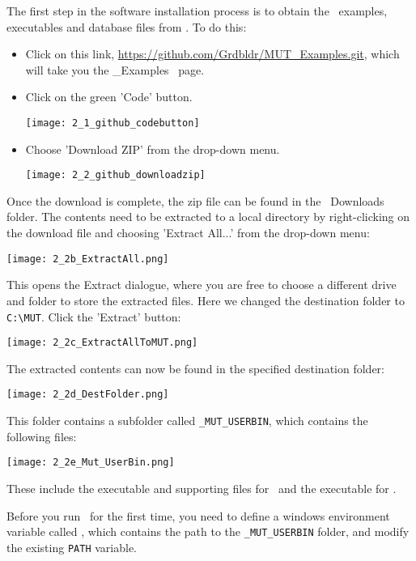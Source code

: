 \label{texfile:Installation}
The first step in the software installation process is to obtain the \mut\ examples, executables and database files from
\github.  To do this:
\begin{itemize}
     \item Click on this link, \url{https://github.com/Grdbldr/MUT_Examples.git}, which will take you the \mut\_Examples \github\ page.
     \item Click on the green 'Code' button.

        \texttt{[image: 2\_1\_github\_codebutton]}

     \item Choose 'Download ZIP' from the drop-down menu.

        \texttt{[image: 2\_2\_github\_downloadzip]}

\end{itemize}

Once the download is complete, the zip file can be found in the \windows\ Downloads folder.  The contents need to be extracted to a local directory by right-clicking on the download file and choosing 'Extract All...' from the drop-down menu:

        \texttt{[image: 2\_2b\_ExtractAll.png]}

This opens the Extract dialogue, where you are free to choose a different drive and folder to store the extracted files.  Here we changed the destination folder to \verb+C:\MUT+.  Click the 'Extract' button:

        \texttt{[image: 2\_2c\_ExtractAllToMUT.png]}

The extracted contents can now be found in the specified destination folder:

        \texttt{[image: 2\_2d\_DestFolder.png]}

This folder contains a subfolder called \texttt{\_MUT\_USERBIN}, which contains the following files:


        \texttt{[image: 2\_2e\_Mut\_UserBin.png]} \label{page:userbin}

These include the executable and supporting files for \mut\ and the executable for \mfus.

Before you run \mut\ for the first time, you need to define a windows environment variable called \bin, which contains the path to the \texttt{\_MUT\_USERBIN} folder, and modify the existing \texttt{PATH} variable.

